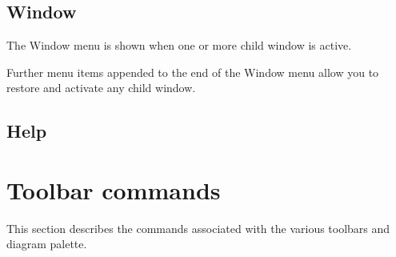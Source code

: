 \begin{comment}%
\section{View}

\begin{twocollist}\itemsep=0pt
\twocolitem{{\bf Toolbar}}{Toggles the toolbar on and off.}
\twocolitem{{\bf Status Bar}}{Toggles the status bar on and off.}
\twocolitem{{\bf Settings}}{Invokes the \helpref{Settings dialog}{settings} to allow you to adjust a variety of
settings.}
\end{twocollist}
\end{comment}%

\section{Window}

The Window menu is shown when one or more child window is active.

\begin{twocollist}\itemsep=0pt
\end{twocollist}

Further menu items appended to the end of the Window menu allow you
to restore and activate any child window.

\section{Help}

\begin{twocollist}\itemsep=0pt
\end{twocollist}

\chapter{Toolbar commands}\label{toolbarcommands}%
%
\setfooter{\thepage}{}{}{}{}{\thepage}%

This section describes the commands associated with the various toolbars and diagram palette.

